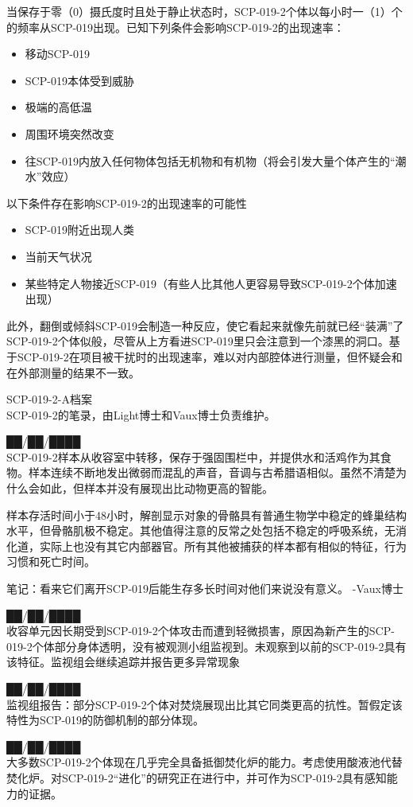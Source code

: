 当保存于零（0）摄氏度时且处于静止状态时，SCP-019-2个体以每小时一（1）个的频率从SCP-019出现。已知下列条件会影响SCP-019-2的出现速率：

\begin{itemize}
\item 移动SCP-019
\item SCP-019本体受到威胁
\item 极端的高低温
\item 周围环境突然改变
\item 往SCP-019内放入任何物体包括无机物和有机物（将会引发大量个体产生的“潮水”效应）
\end{itemize}

以下条件存在影响SCP-019-2的出现速率的可能性

\begin{itemize}
\item SCP-019附近出现人类
\item 当前天气状况
\item 某些特定人物接近SCP-019（有些人比其他人更容易导致SCP-019-2个体加速出现）
\end{itemize}

此外，翻倒或倾斜SCP-019会制造一种反应，使它看起来就像先前就已经“装满”了SCP-019-2个体似般，尽管从上方看进SCP-019里只会注意到一个漆黑的洞口。基于SCP-019-2在项目被干扰时的出现速率，难以对内部腔体进行测量，但怀疑会和在外部测量的结果不一致。

SCP-019-2-A档案\\
SCP-019-2的笔录，由Light博士和Vaux博士负责维护。

██\slash ██\slash ████　　　　　　　　　　　　　　　　　　　　　　\\
SCP-019-2样本从收容室中转移，保存于强固围栏中，并提供水和活鸡作为其食物。样本连续不断地发出微弱而混乱的声音，音调与古希腊语相似。虽然不清楚为什么会如此，但样本并没有展现出比动物更高的智能。

样本存活时间小于48小时，解剖显示对象的骨骼具有普通生物学中稳定的蜂巢结构水平，但骨骼肌极不稳定。其他值得注意的反常之处包括不稳定的呼吸系统，无消化道，实际上也没有其它内部器官。所有其他被捕获的样本都有相似的特征，行为习惯和死亡时间。

笔记：看来它们离开SCP-019后能生存多长时间对他们来说没有意义。 -Vaux博士

██\slash ██\slash ████\\
收容单元因长期受到SCP-019-2个体攻击而遭到轻微损害，原因為新产生的SCP-019-2个体部分身体透明，没有被观测小组监视到。未观察到以前的SCP-019-2具有该特征。监视组会继续追踪并报告更多异常现象

██\slash ██\slash ████\\
监视组报告：部分SCP-019-2个体对焚烧展现出比其它同类更高的抗性。暂假定该特性为SCP-019的防御机制的部分体现。

██\slash ██\slash ████\\
大多数SCP-019-2个体现在几乎完全具备抵御焚化炉的能力。考虑使用酸液池代替焚化炉。对SCP-019-2“进化”的研究正在进行中，并可作为SCP-019-2具有感知能力的证据。
